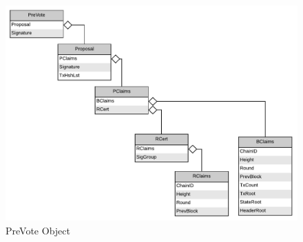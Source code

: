 \begin{figure}[H]
    \centering
    \includegraphics[scale=0.5]{figures/PreVote_Object.pdf}
    \caption{PreVote Object}
\end{figure}
